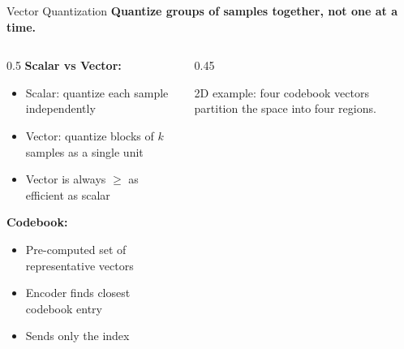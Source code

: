 \documentclass[aspectratio=169,12pt]{beamer}
\begin{document}
\begin{frame}{Vector Quantization}
    \textbf{Quantize groups of samples together, not one at a time.}
    
    \vspace{0.3cm}
    \begin{columns}
        \begin{column}{0.5\textwidth}
            \textbf{Scalar vs Vector:}
            \begin{itemize}
                \item Scalar: quantize each sample independently
                \item Vector: quantize blocks of $k$ samples as a single unit
                \item Vector is always $\geq$ as efficient as scalar
            \end{itemize}
            
            \vspace{0.2cm}
            \textbf{Codebook:}
            \begin{itemize}
                \item Pre-computed set of representative vectors
                \item Encoder finds closest codebook entry
                \item Sends only the index
            \end{itemize}
        \end{column}
        \begin{column}{0.45\textwidth}
            \begin{center}
            \end{center}
            {\small 2D example: four codebook vectors partition the space into four regions.}
        \end{column}
    \end{columns}
\end{frame}
\end{document}
